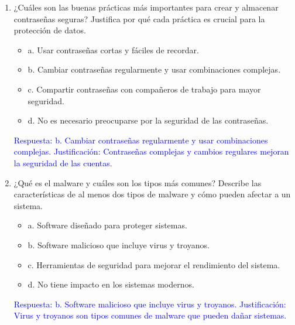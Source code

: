 \documentclass[a4paper]{article}
\begin{document}
\begin{enumerate}
    \vspace{1cm}
    
    \item ¿Cuáles son las buenas prácticas más importantes para crear y almacenar contraseñas seguras? 
    Justifica por qué cada práctica es crucial para la protección de datos.
    \begin{itemize}
        \item a. Usar contraseñas cortas y fáciles de recordar.
        \item b. Cambiar contraseñas regularmente y usar combinaciones complejas.
        \item c. Compartir contraseñas con compañeros de trabajo para mayor seguridad.
        \item d. No es necesario preocuparse por la seguridad de las contraseñas.
    \end{itemize}
    \textcolor{blue}{Respuesta: b. Cambiar contraseñas regularmente y usar combinaciones complejas. Justificación: Contraseñas complejas y cambios regulares mejoran la seguridad de las cuentas.}
    \vspace{1cm}
    
    \item ¿Qué es el malware y cuáles son los tipos más comunes? 
    Describe las características de al menos dos tipos de malware y cómo pueden afectar a un sistema.
    \begin{itemize}
        \item a. Software diseñado para proteger sistemas.
        \item b. Software malicioso que incluye virus y troyanos.
        \item c. Herramientas de seguridad para mejorar el rendimiento del sistema.
        \item d. No tiene impacto en los sistemas modernos.
    \end{itemize}
    \textcolor{blue}{Respuesta: b. Software malicioso que incluye virus y troyanos. Justificación: Virus y troyanos son tipos comunes de malware que pueden dañar sistemas.}
    \vspace{1cm}
    

\end{enumerate}
\end{document}
